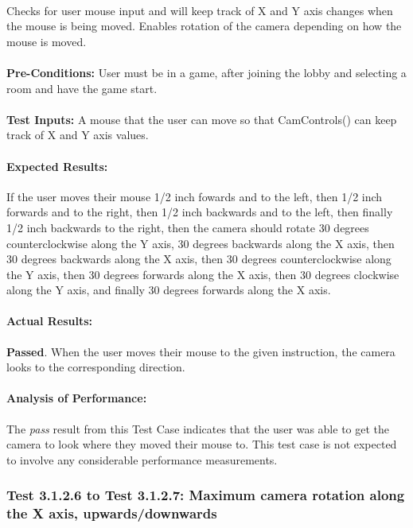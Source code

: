 \documentclass{article}
\begin{document}
    \paragraph{} Checks for user mouse input and will keep track of X and Y axis changes when the mouse is being moved. Enables rotation of the camera depending on how the mouse is moved.
    \paragraph{}\textbf{Pre-Conditions:} User must be in a game, after joining the lobby and selecting a room and have the game start.
    \paragraph{}\textbf{Test Inputs:} A mouse that the user can move so that CamControls() can keep track of X and Y axis values.
    \paragraph{Expected Results:} If the user moves their mouse 1/2 inch fowards and to the left, then 1/2 inch forwards and to the right, then 1/2 inch backwards and to the left, then finally 1/2 inch backwards to the right, then the camera should rotate 30 degrees counterclockwise along the Y axis, 30 degrees backwards along the X axis, then 30 degrees backwards along the X axis, then 30 degrees counterclockwise along the Y axis, then 30 degrees forwards along the X axis, then 30 degrees clockwise along the Y axis, and finally 30 degrees forwards along the X axis.
    \paragraph{Actual Results:} \textbf{Passed}. When the user moves their mouse to the given instruction, the camera looks to the corresponding direction. 
    \paragraph{Analysis of Performance:} The \emph{pass} result from this Test Case indicates that the user was able to get the camera to look where they moved their mouse to. This test case is not expected to involve any considerable performance measurements. 
    
    \subsubsection{Test 3.1.2.6 to Test 3.1.2.7: Maximum camera rotation along the X axis, upwards/downwards}
\end{document}
